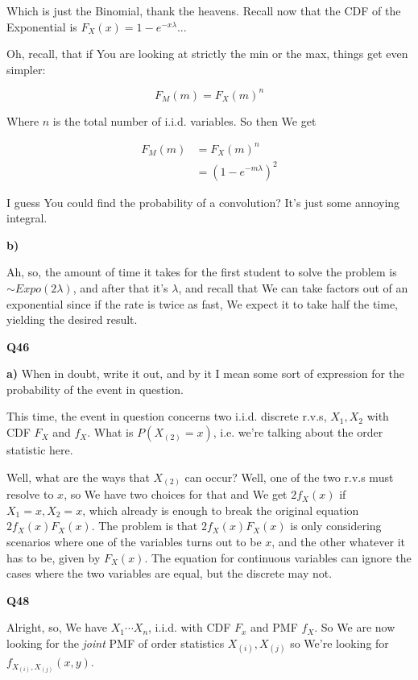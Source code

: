 \documentclass{article}
\begin{document}
			Which is just the Binomial, thank the heavens. Recall now that the CDF of the Exponential is $F_X(x) = 1-e^{-x\lambda}$...
			
			Oh, recall, that if You are looking at strictly the min or the max, things get even simpler:
			
			\[ F_M(m) = F_X(m)^n \]
			
			Where $n$ is the total number of i.i.d. variables. So then We get
			
			\begin{align*}
			F_M(m) &= F_X(m)^n\\
			&= (1-e^{-m\lambda})^2
			\end{align*}
						
			I guess You could find the probability of a convolution? It's just some annoying integral.
			
			\textbf{b)}
			
			Ah, so, the amount of time it takes for the first student to solve the problem is $\sim Expo(2\lambda)$, and after that it's $\lambda$, and recall that We can take factors out of an exponential since if the rate is twice as fast, We expect it to take half the time, yielding the desired result.
			
			\hfill
			
		\textbf{Q46}
		
			\textbf{a)} When in doubt, write it out, and by it I mean some sort of expression for the probability of the event in question.
			
			This time, the event in question concerns two i.i.d. discrete r.v.s, $X_1, X_2$ with CDF $F_
X$ and $f_X$. What is $P(X_{(2)} = x)$, i.e. we're talking about the order statistic here.

			Well, what are the ways that $X_{(2)}$ can occur? Well, one of the two r.v.s must resolve to $x$, so We have two choices for that and We get $2f_X(x)$ if $X_1=x, X_2=x$, which already is enough to break the original equation $2f_X(x)F_X(x)$. The problem is that $2f_X(x)F_X(x)$ is only considering scenarios where one of the variables turns out to be $x$, and the other whatever it has to be, given by $F_X(x)$. The equation for continuous variables can ignore the cases where the two variables are equal, but the discrete may not.
			
		\textbf{Q48}
			
			Alright, so, We have $X_1\cdots X_n$, i.i.d. with CDF $F_x$ and PMF $f_X$. So We are now looking for the \textit{joint} PMF of order statistics $X_{(i)}, X_{(j)}$ so We're looking for $f_{X_{(i)}, X_{(j)}}(x, y)$.
			
\end{document}
